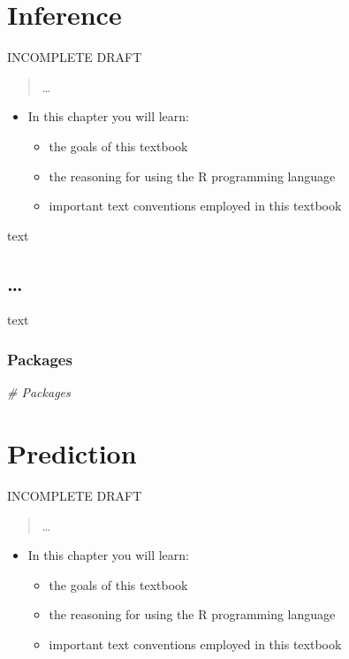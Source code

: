 \documentclass[
]{article}
\newenvironment{Shaded}{\begin{snugshade}}{\end{snugshade}}
\newcommand{\CommentTok}[1]{\textcolor[rgb]{0.56,0.35,0.01}{\textit{#1}}}
\providecommand{\tightlist}{%
  \setlength{\itemsep}{0pt}\setlength{\parskip}{0pt}}
\newenvironment{rmdblock}[1]
  {\begin{shaded*}
  \begin{itemize}
  \renewcommand{\labelitemi}{
    \raisebox{-.5\height}[0pt][0pt]{
      {\setkeys{Gin}{width=2em,keepaspectratio}\texttt{[image: assets/images/\#1]}}
    }
  }
  \item
  }
  {
  \end{itemize}
  \end{shaded*}
  }
\newenvironment{rmdkey}
  {\begin{rmdblock}{key}}
  {\end{rmdblock}}
\begin{document}
\hypertarget{inference}{%
\section{Inference}\label{inference}}

INCOMPLETE DRAFT

\begin{quote}
\ldots{}
\end{quote}

\begin{rmdkey}
In this chapter you will learn:

\begin{itemize}
\tightlist
\item
  the goals of this textbook
\item
  the reasoning for using the R programming language
\item
  important text conventions employed in this textbook
\end{itemize}
\end{rmdkey}

text

\hypertarget{section-4}{%
\subsection{\ldots{}}\label{section-4}}

text

\hypertarget{inference-packages}{%
\subsubsection{Packages}\label{inference-packages}}

\begin{Shaded}
\begin{Highlighting}[]
\CommentTok{\# Packages}
\end{Highlighting}
\end{Shaded}

\hypertarget{prediction}{%
\section{Prediction}\label{prediction}}

INCOMPLETE DRAFT

\begin{quote}
\ldots{}
\end{quote}

\begin{rmdkey}
In this chapter you will learn:

\begin{itemize}
\tightlist
\item
  the goals of this textbook
\item
  the reasoning for using the R programming language
\item
  important text conventions employed in this textbook
\end{itemize}
\end{rmdkey}
\end{document}
